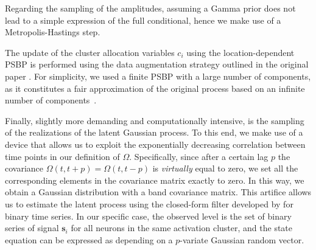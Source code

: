 Regarding the sampling of the amplitudes, assuming a Gamma prior does not lead to a simple expression of the full conditional, hence we make use of a Metropolis-Hastings step.

The update of the cluster allocation variables $c_i$ using the location-dependent PSBP is performed using the data augmentation strategy outlined in the original paper \parencite{rodriguez2011}. For simplicity, we used a finite PSBP with a large number of components, as it constitutes a fair approximation of the original process based on an infinite number of components~\parencite{rodriguez2011, ishwaran2001}.

Finally, slightly more demanding and computationally intensive, is the sampling of the realizations of the latent Gaussian process. To this end, we make use of a device that allows us to exploit the exponentially decreasing correlation between time points in our definition of $\Omega$. Specifically, since after a certain lag $p$ the covariance $\Omega(t,t+p)=\Omega(t,t-p)$ is \textit{virtually} equal to zero, we set all the corresponding elements in the covariance matrix exactly to zero. In this way, we obtain a Gaussian distribution with a band covariance matrix. This artifice allows us to estimate the latent process using the closed-form filter developed by \cite{fasano2021} for binary time series. In our specific case, the observed level is the set of binary series of signal $\bm{s}_i$ for all neurons in the same activation cluster, and the state equation can be expressed as depending on a $p$-variate Gaussian random vector.







